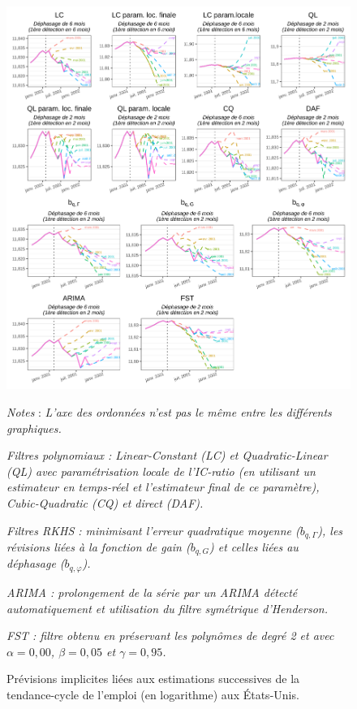 \documentclass[
  12pt,
  a4paper,french]{article}
\newcommand\1{\mathds{1}}
\begin{document}
\begin{figure}

{\centering \includegraphics[width=0.95\linewidth]{img/nber/ce16ov_fev2001_prev_imp} 

}

\caption[Prévisions implicites liées aux estimations successives de la tendance-cycle de l'emploi (en logarithme) aux États-Unis]{Prévisions implicites liées aux estimations successives de la tendance-cycle de l'emploi (en logarithme) aux États-Unis.}\label{fig:ce16ov-previmp-lp}

\footnotesize


\emph{Notes} : \emph{L'axe des ordonnées n'est pas le même entre les différents graphiques.}

\emph{Filtres polynomiaux : \emph{Linear-Constant} (LC) et \emph{Quadratic-Linear} (QL) avec paramétrisation locale de l'IC-ratio (en utilisant un estimateur en temps-réel et l'estimateur final de ce paramètre), \emph{Cubic-Quadratic} (CQ) et direct (DAF).}

\emph{Filtres RKHS : minimisant l'erreur quadratique moyenne (\(b_{q,\Gamma}\)), les révisions liées à la fonction de gain (\(b_{q,G}\)) et celles liées au déphasage (\(b_{q,\varphi}\)).}

\emph{ARIMA : prolongement de la série par un ARIMA détecté automatiquement et utilisation du filtre symétrique d'Henderson.}

\emph{FST : filtre obtenu en préservant les polynômes de degré 2 et avec \(\alpha=0,00\), \(\beta=0,05\) et \(\gamma=0,95\).}
\normalsize\end{figure}
\end{document}
